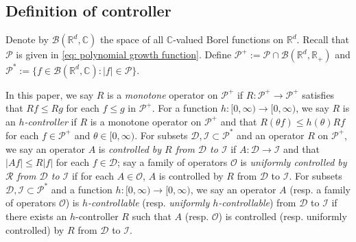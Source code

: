 \documentclass[12pt,a4paper]{amsart}
\theoremstyle{plain}
\theoremstyle{definition}
\numberwithin{equation}{section}
\begin{document}
\subsection{Definition of controller}
\label{sec: controller}
Denote by $\mathcal B(\mathbb R^d, \mathbb C)$ the space of all $\mathbb C$-valued Borel functions on $\mathbb R^d$.
Recall that $\mathcal P$ is given in \eqref{eq: polynomial growth function}.
Define $\mathcal P^+:= \mathcal P \cap \mathcal B(\mathbb R^d, \mathbb R_+)$ and $\mathcal P^*:= \{f\in \mathcal B(\mathbb R^d, \mathbb C): |f|\in \mathcal P\}$.




In this paper, we say $R$ is a \emph{monotone} operator on $\mathcal P^+$ if $R:\mathcal P^+ \to \mathcal P^+$ satisfies that $Rf\leq Rg$ for each $f\leq g$ in $\mathcal P^+$.
For a function $h: [0,\infty) \to [0,\infty)$, we say $R$ is an \emph{$h$-controller} if $R$ is a monotone operator on $\mathcal P^+$ and that $R(\theta f)\leq h(\theta) Rf$ for each $f\in \mathcal P^+$ and $\theta \in [0,\infty)$.
For subsets $\mathcal D, \mathcal I\subset \mathcal P^*$ and an operator $R$ on $\mathcal P^+$, we say an operator $A$ is \emph{controlled by $R$ from $\mathcal D$ to $\mathcal I$} if $A:\mathcal D \to \mathcal I$ and that $|Af| \leq R|f|$ for each $f\in \mathcal D$; say a family of operators $\mathscr O$ is \emph{uniformly controlled by $\mathcal R$ from $\mathcal D$ to $\mathcal I$} if for each $A\in \mathcal O$, $A$ is controlled by $R$ from $\mathcal D$ to $\mathcal I$.
For subsets $\mathcal D, \mathcal I\subset \mathcal P^*$ and a function $h:[0,\infty) \to [0,\infty)$, we say an operator $A$ (resp. a family of operators $\mathscr O$) is \emph{$h$-controllable} (resp. \emph{uniformly $h$-controllable}) from $\mathcal D$ to $\mathcal I$ if there exists an $h$-controller $R$ such that $A$ (resp. $\mathscr O$) is controlled (resp. uniformly controlled) by $R$ from $\mathcal D$ to $\mathcal I$. 
\end{document}
